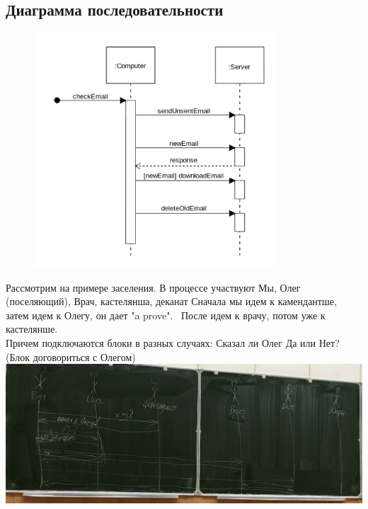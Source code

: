 \documentclass[12pt; a4paper]{book}
\begin{document}
\subsection{Диаграмма последовательности}
\begin{figure}[!hbp]
\includegraphics[angle=0, width=0.8\textwidth]{IMG/3} \\
\end{figure}
Рассмотрим на примере заселения.  В процессе участвуют Мы, Олег (поселяющий), Врач, кастелянша, деканат
Сначала мы идем к камендантше, затем идем к Олегу, он дает "a prove".  После идем к врачу, потом уже  к кастелянше.\\
Причем подключаются блоки в разных случаях: Сказал ли Олег Да или Нет? (Блок договориться с Олегом)\\
\includegraphics[angle=0, width=\textwidth]{IMG/IMG_0818.jpg} \\
\newpage
\end{document}
